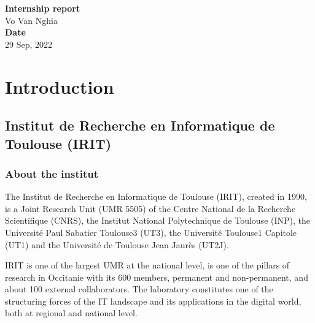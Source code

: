 \documentclass[
  a4paper, xcolor = usenames,dvipsnames]{article}
\author{}
\date{\vspace{-2.5em}}
\theoremstyle{definition}
\theoremstyle{definition}
\theoremstyle{definition}
\theoremstyle{definition}
\theoremstyle{remark}
\begin{document}
\onehalfspacing


\vspace*{\fill}
\begin{center}
  \Large{\textbf{Internship report}}\\
  \vspace*{1\baselineskip}
  Vo Van Nghia\\
  \vfill
  \vspace*{\fill}
  \Large{\textbf{Date}}\\
  29 Sep, 2022
\end{center}

\newpage

\newpage
{}
\renewcommand{\contentsname}{Table of contents}
\tableofcontents

\newpage
{}

\hypertarget{introduction}{%
\section{Introduction}\label{introduction}}

\hypertarget{institut-de-recherche-en-informatique-de-toulouse-irit}{%
\subsection{Institut de Recherche en Informatique de Toulouse (IRIT)}\label{institut-de-recherche-en-informatique-de-toulouse-irit}}

\hypertarget{about-the-institut}{%
\subsubsection{About the institut}\label{about-the-institut}}

The Institut de Recherche en Informatique de Toulouse (IRIT), created in 1990, is a Joint Research Unit (UMR 5505) of the Centre National de la Recherche Scientifique (CNRS), the Institut National Polytechnique de Toulouse (INP), the Université Paul Sabatier Toulouse3 (UT3), the Université Toulouse1 Capitole (UT1) and the Université de Toulouse Jean Jaurès (UT2J).

IRIT is one of the largest UMR at the national level, is one of the pillars of research in Occitanie with its 600 members, permanent and non-permanent, and about 100 external collaborators. The laboratory constitutes one of the structuring forces of the IT landscape and its applications in the digital world, both at regional and national level.
\end{document}
